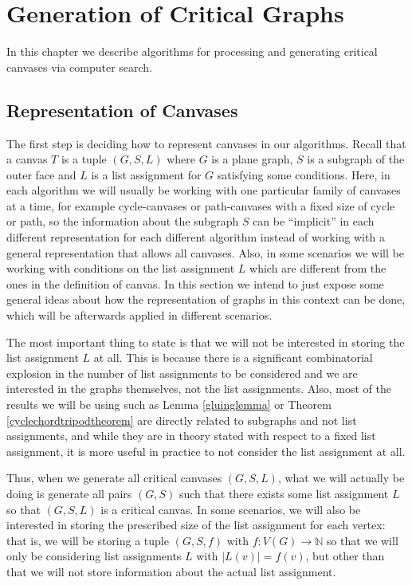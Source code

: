 \chapter{Generation of Critical Graphs}

In this chapter we describe algorithms for processing and generating critical canvases via computer search.

\section{Representation of Canvases}

The first step is deciding how to represent canvases in our algorithms. Recall that a canvas $T$ is a tuple 
$(G, S, L)$ where $G$ is a plane graph, $S$ is a subgraph of the outer face and $L$ is a list assignment for 
$G$ satisfying some conditions. Here, in each algorithm we will usually be working with one particular family of 
canvases at a time, for example cycle-canvases or path-canvases with a fixed size of cycle or path, so the 
information about the subgraph $S$ can be ``implicit'' in each different representation for each different algorithm
instead of working with a general representation that allows all canvases. Also, in some scenarios we will be 
working with conditions on the list assignment $L$ which are different from the ones in the definition of canvas.
In this section we intend to just expose some general ideas about how the representation of graphs in this context
can be done, which will be afterwards applied in different scenarios.

The most important thing to state is that we will not be interested in storing the list assignment $L$ at all. 
This is because there is a significant combinatorial explosion in the number of list assignments to be considered and
we are interested in the graphs themselves, not the list assignments. Also, most of the results
we will be using such as Lemma \ref{gluinglemma} or Theorem \ref{cyclechordtripodtheorem} are directly related to subgraphs
and not list assignments, and while they are in theory stated with respect to a fixed list assignment, it is more
useful in practice to not consider the list assignment at all. 

Thus, when we generate all critical canvases $(G, S, L)$, what we will actually be doing is generate all pairs $(G, S)$ 
such that there exists some list assignment $L$  so that $(G, S, L)$ is a critical canvas. In some scenarios, we will also
be interested in storing the prescribed size of the list assignment for each vertex: that is, we will be storing a tuple $(G, S, f)$
with $f : V(G) \rightarrow \mathbb{N}$ so that we will only be considering list assignments $L$ with $|L(v)| = f(v)$, but other
than that we will not store information about the actual list assignment. 

